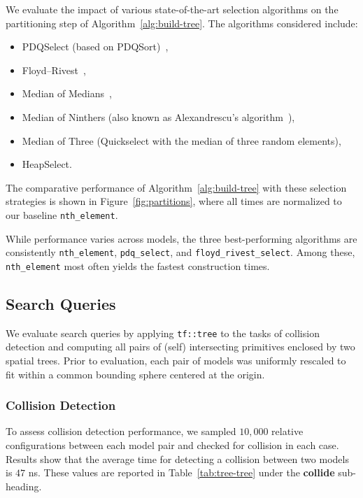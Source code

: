 We evaluate the impact of various state-of-the-art selection
algorithms on the partitioning step of
Algorithm~\ref{alg:build-tree}. The algorithms considered include:

\begin{itemize}
  \item PDQSelect (based on PDQSort)~\cite{pdqSort},
  \item Floyd–Rivest~\cite{floyd1975expected},
  \item Median of Medians~\cite{mom},
  \item Median of Ninthers (also known as Alexandrescu’s
        algorithm~\cite{alexandrescu-sorting}),
  \item Median of Three (Quickselect with the median of three
        random elements),
  \item HeapSelect.
\end{itemize}

The comparative performance of
Algorithm~\ref{alg:build-tree} with these selection strategies
is shown in Figure~\ref{fig:partitions}, where all times are
normalized to our baseline \texttt{nth\_element}.

While performance varies across models, the three best-performing
algorithms are consistently \texttt{nth\_element},
\texttt{pdq\_select}, and \texttt{floyd\_rivest\_select}.
Among these, \texttt{nth\_element} most often yields the
fastest construction times.



\subsection{Search Queries}

We evaluate search queries by applying \texttt{tf::tree} to the tasks
of collision detection and computing all pairs of (self) intersecting
primitives enclosed by two spatial trees. Prior to evaluation, each
pair of models was uniformly rescaled to fit within a common bounding
sphere centered at the origin. 


\subsubsection{Collision Detection}

To assess collision detection performance, we sampled $10{,}000$
relative configurations between each model pair and checked for
collision in each case. Results show that the average time for
detecting a collision between two models is $47$ ns. These values
are reported in Table~\ref{tab:tree-tree} under the
\textbf{collide} sub-heading.

